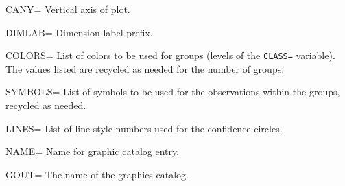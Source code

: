 \begin{proglist}
\item[CANY=] Vertical axis of plot. 

\item[DIMLAB=] Dimension label prefix. 

\item[COLORS=] List of colors to be used for groups (levels of the \texttt{CLASS=} variable).
The values listed are recycled as needed for the number of groups.
\newline
{}

\item[SYMBOLS=] List of symbols to be used for the observations within the groups,
recycled as needed.

\item[LINES=] List of line style numbers used for the confidence circles.
\newline
{}

\item[NAME=] Name for graphic catalog entry. 

\item[GOUT=] The name of the graphics catalog. 

\end{proglist}

